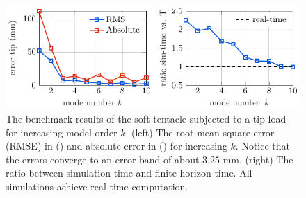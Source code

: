 \begin{figure}[!t]
\centering
% 
\includegraphics*[width=\textwidth]{./pdf/thesis-figure-5-6.pdf}
\caption{The benchmark results of the soft tentacle subjected to a tip-load for increasing model order $k$. (left) The root mean square error (RMSE) in () and absolute error in () for increasing $k$. Notice that the errors converge to an error band of about $3.25$ \si{\milli \meter}. (right) The ratio between simulation time and finite horizon time. All simulations achieve real-time computation. }
\vspace{-0.2cm}
\label{fig:C3:EX2:mode_convergence_bench}
\end{figure}
%

